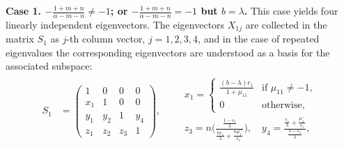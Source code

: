 \documentclass[usletter,11pt]{article}
\theoremstyle{remark}
\begin{document}
{\bf Case 1. $-\frac{1+m+n}{\alpha-m-n}\ne -1$; or $-\frac{1+m+n}{\alpha-m-n}= -1$ but $b=\lambda$. } This case yields four linearly independent eigenvectors. The eigenvectors $X_{1j}$ are collected in the matrix $S_1$ as $j$-th column vector, $j=1,2,3,4$, and in the case of repeated eigenvalues 
the corresponding eigenvectors are understood as a basis for the associated subspace:
\begin{align*}
 S_1&=
 \begin{pmatrix}
    1 & 0 & 0 & 0\\
    x_1 & 1 & 0 & 0\\
    y_1 & y_2 & 1 & y_4\\
    z_1 & z_2 & z_3 &1
 \end{pmatrix}, \quad \quad
 \begin{array}{l}
  x_1=
 \begin{cases}
  \frac{(b-\lambda)r_1}{1+\mu_{11}} & \text{if $\mu_{11}\ne -1$,}\\
  0 & \text{otherwise,}
 \end{cases}\\
 z_3=n\bigg(\frac{\frac{1-s_1}{\lambda}}{\frac{n r_1}{\lambda} + \frac{n\mu_{1}^+}{s_1}}\bigg), \quad y_4=\frac{\frac{r_1}{\lambda}+\frac{\mu_1^-}{s_1}}{\frac{1-s_1}{\lambda}},\\
 \end{array}
\end{align*}
\end{document}

